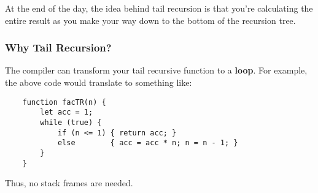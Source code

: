 \documentclass[letterpaper]{article}
\begin{document}
\bigskip 

At the end of the day, the idea behind tail recursion is that you're calculating the entire result as you make your way down to the bottom of the recursion tree.


\subsubsection{Why Tail Recursion?}
The compiler can transform your tail recursive function to a \textbf{loop}. For example, the above code would translate to something like: 
\begin{verbatim}
    function facTR(n) {
        let acc = 1;
        while (true) {
            if (n <= 1) { return acc; }
            else        { acc = acc * n; n = n - 1; }
        }
    }
\end{verbatim}
Thus, no stack frames are needed.
\end{document}
